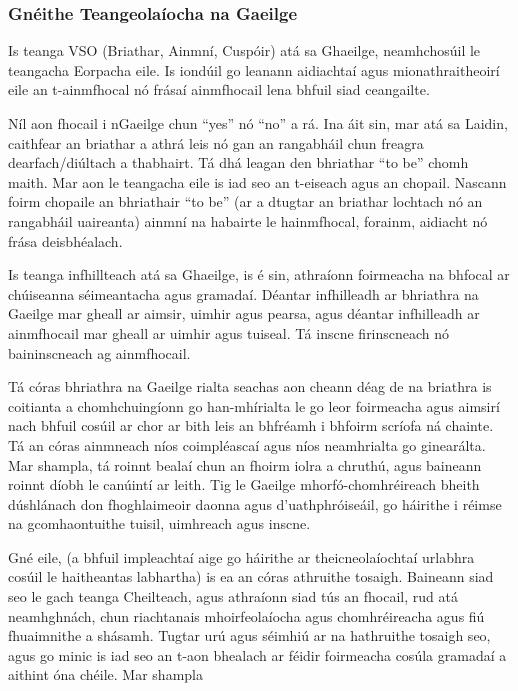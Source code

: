 \begin{multicols}{2}
\subsubsection{Gnéithe Teangeolaíocha na Gaeilge}

Is teanga VSO (Briathar, Ainmní, Cuspóir) atá sa Ghaeilge, neamhchosúil le teangacha Eorpacha eile. Is iondúil go leanann aidiachtaí agus mionathraitheoirí eile an t-ainmfhocal nó frásaí ainmfhocail lena bhfuil siad ceangailte.


Níl aon fhocail i nGaeilge chun “yes” nó “no” a rá. Ina áit sin, mar atá sa Laidin, caithfear an briathar a athrá leis nó gan an rangabháil chun freagra dearfach/diúltach a thabhairt. Tá dhá leagan den bhriathar “to be” chomh maith. Mar aon le teangacha eile is iad seo an t-eiseach agus an chopail. Nascann foirm chopaile an bhriathair “to be” (ar a dtugtar an briathar lochtach nó an rangabháil uaireanta) ainmní na habairte le hainmfhocal, forainm, aidiacht nó frása deisbhéalach.

Is teanga infhillteach atá sa Ghaeilge, is é sin, athraíonn foirmeacha na bhfocal ar chúiseanna séimeantacha agus gramadaí. Déantar infhilleadh ar bhriathra na Gaeilge mar gheall ar aimsir, uimhir agus pearsa, agus déantar infhilleadh ar ainmfhocail mar gheall ar uimhir agus tuiseal.  Tá inscne firinscneach nó baininscneach ag ainmfhocail.

Tá córas bhriathra na Gaeilge rialta seachas aon cheann déag de na briathra is coitianta a chomhchuingíonn go han-mhírialta le go leor foirmeacha agus aimsirí nach bhfuil cosúil ar chor ar bith leis an bhfréamh i bhfoirm scríofa ná chainte. Tá an córas ainmneach níos coimpléascaí agus níos neamhrialta go ginearálta. Mar shampla, tá roinnt bealaí chun an fhoirm iolra a chruthú, agus baineann roinnt díobh le canúintí ar leith. Tig le Gaeilge mhorfó-chomhréireach bheith dúshlánach don fhoghlaimeoir daonna agus d’uathphróiseáil, go háirithe i réimse na gcomhaontuithe tuisil, uimhreach agus inscne.

Gné eile, (a bhfuil impleachtaí aige go háirithe ar theicneolaíochtaí urlabhra cosúil le haitheantas labhartha) is ea an córas athruithe tosaigh. Baineann siad seo le gach teanga Cheilteach, agus athraíonn siad tús an fhocail, rud atá neamhghnách, chun riachtanais mhoirfeolaíocha agus chomhréireacha agus fiú fhuaimnithe a shásamh. Tugtar urú agus séimhiú ar na hathruithe tosaigh seo, agus go minic is iad seo an t-aon bhealach ar féidir foirmeacha cosúla gramadaí a aithint óna chéile. Mar shampla


\end{multicols}
